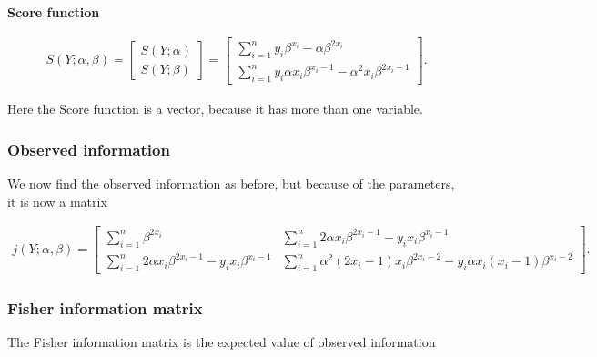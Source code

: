 \textbf{Score function}

\begin{align*}
    S\left( Y; \alpha, \beta \right) = \begin{bmatrix} S(Y;\alpha) \\ S(Y; \beta) \end{bmatrix} = \begin{bmatrix} \sum_{i=1}^n y_i \beta^{x_i} - \alpha\beta^{2x_i} \\ \sum_{i = 1}^n y_i\alpha x_i \beta^{x_i - 1} - \alpha^2 x_i \beta^{2x_i - 1} \end{bmatrix}.
\end{align*}

Here the Score function is a vector, because it has more than one variable. 

\subsubsection{Observed information}

We now find the observed information as before, but because of the parameters, it is now a matrix

\begin{align*}
    j\left( Y; \alpha ,\beta \right) = \begin{bmatrix} 
    \sum_{i = 1}^n \beta^{2x_i} 
    &
    \sum_{i = 1}^n 2\alpha x_i \beta^{2x_i - 1} - y_ix_i\beta^{x_i - 1}
    \\
    \sum_{i = 1}^n 2\alpha x_i \beta^{2x_i - 1} - y_ix_i\beta^{x_i - 1} 
    &
    \sum_{i = 1}^n \alpha^2(2x_i - 1)x_i\beta^{2x_i - 2} - y_i \alpha x_i(x_i - 1) \beta^{x_i - 2}
    \end{bmatrix}.
\end{align*}

\subsubsection{Fisher information matrix}

The Fisher information matrix is the expected value of observed information

